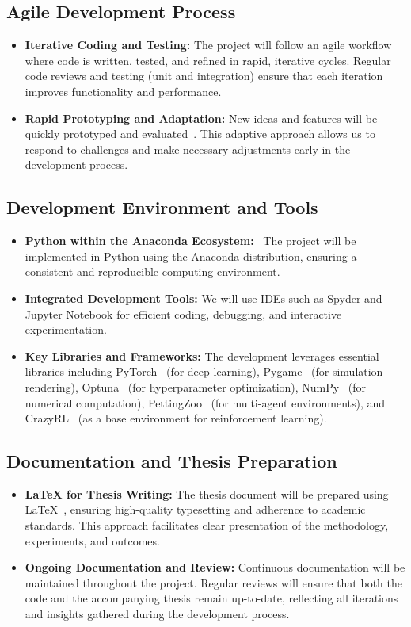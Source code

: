 \documentclass[12pt,a4paper,twoside,openany]{book}
\begin{document}
\subsection*{Agile Development Process}
\begin{itemize}
    \item \textbf{Iterative Coding and Testing:} The project will follow an agile workflow~\cite{AgileManifesto} where code is written, tested, and refined in rapid, iterative cycles. Regular code reviews and testing (unit and integration) ensure that each iteration improves functionality and performance.
    \item \textbf{Rapid Prototyping and Adaptation:} New ideas and features will be quickly prototyped and evaluated~\cite{XP}. This adaptive approach allows us to respond to challenges and make necessary adjustments early in the development process.
\end{itemize}

\subsection*{Development Environment and Tools}
\begin{itemize}
    \item \textbf{Python within the Anaconda Ecosystem:}~\cite{Anaconda} The project will be implemented in Python using the Anaconda distribution, ensuring a consistent and reproducible computing environment.
    \item \textbf{Integrated Development Tools:} We will use IDEs such as Spyder and Jupyter Notebook for efficient coding, debugging, and interactive experimentation.
    \item \textbf{Key Libraries and Frameworks:} The development leverages essential libraries including PyTorch~\cite{PyTorch} (for deep learning), Pygame~\cite{Pygame} (for simulation rendering), Optuna~\cite{Optuna} (for hyperparameter optimization), NumPy~\cite{NumPy} (for numerical computation), PettingZoo~\cite{PettingZoo} (for multi-agent environments), and CrazyRL~\cite{CrazyRL} (as a base environment for reinforcement learning).
\end{itemize}

\subsection*{Documentation and Thesis Preparation}
\begin{itemize}
    \item \textbf{LaTeX for Thesis Writing:} The thesis document will be prepared using LaTeX~\cite{LaTeX}, ensuring high-quality typesetting and adherence to academic standards. This approach facilitates clear presentation of the methodology, experiments, and outcomes.
    \item \textbf{Ongoing Documentation and Review:} Continuous documentation will be maintained throughout the project. Regular reviews will ensure that both the code and the accompanying thesis remain up-to-date, reflecting all iterations and insights gathered during the development process.
\end{itemize}
\end{document}
